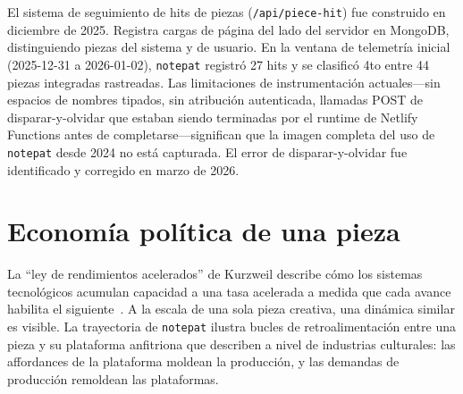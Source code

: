 \documentclass[10pt,letterpaper,twocolumn]{article}
\begin{document}
El sistema de seguimiento de hits de piezas (\texttt{/api/piece-hit}) fue construido en diciembre de 2025. Registra cargas de página del lado del servidor en MongoDB, distinguiendo piezas del sistema y de usuario. En la ventana de telemetría inicial (2025-12-31 a 2026-01-02), \texttt{notepat} registró 27 hits y se clasificó 4to entre 44 piezas integradas rastreadas. Las limitaciones de instrumentación actuales---sin espacios de nombres tipados, sin atribución autenticada, llamadas POST de disparar-y-olvidar que estaban siendo terminadas por el runtime de Netlify Functions antes de completarse---significan que la imagen completa del uso de \texttt{notepat} desde 2024 no está capturada. El error de disparar-y-olvidar fue identificado y corregido en marzo de 2026.

\section{Economía política de una pieza}

La ``ley de rendimientos acelerados'' de Kurzweil describe cómo los sistemas tecnológicos acumulan capacidad a una tasa acelerada a medida que cada avance habilita el siguiente~\citep{kurzweil2005singularity}. A la escala de una sola pieza creativa, una dinámica similar es visible. La trayectoria de \texttt{notepat} ilustra bucles de retroalimentación entre una pieza y su plataforma anfitriona que \citet{nieborg2018platformization} describen a nivel de industrias culturales: las affordances de la plataforma moldean la producción, y las demandas de producción remoldean las plataformas.
\end{document}
